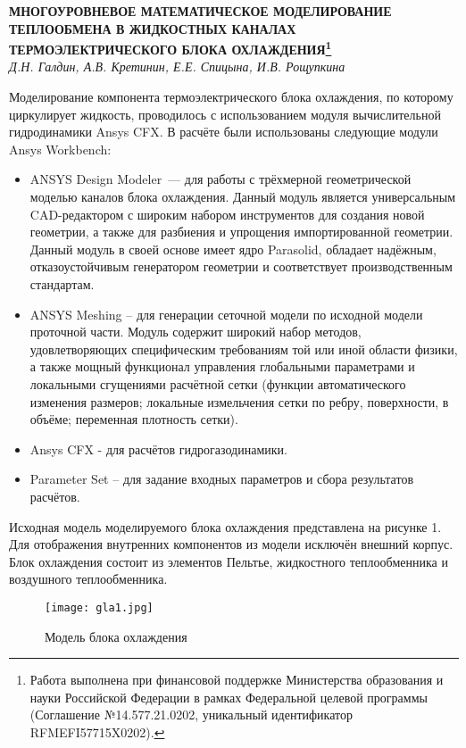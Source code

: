 \begin{center}{ \bf  МНОГОУРОВНЕВОЕ МАТЕМАТИЧЕСКОЕ МОДЕЛИРОВАНИЕ ТЕПЛООБМЕНА В ЖИДКОСТНЫХ КАНАЛАХ ТЕРМОЭЛЕКТРИЧЕСКОГО БЛОКА ОХЛАЖДЕНИЯ\footnote{Работа выполнена при финансовой поддержке Министерства образования и науки Российской Федерации в рамках Федеральной целевой программы (Соглашение №14.577.21.0202, уникальный идентификатор RFMEFI57715X0202).}}\\
{\it Д.Н. Галдин, А.В. Кретинин, Е.Е. Спицына, И.В. Рощупкина} \\
\end{center}

Моделирование компонента термоэлектрического блока охлаждения, по которому циркулирует жидкость, проводилось с использованием модуля вычислительной гидродинамики Ansys CFX.
В расчёте были использованы следующие модули Ansys Workbench:
\begin{itemize}
	\item
		ANSYS Design Modeler~--- для работы с трёхмерной геометрической моделью каналов блока охлаждения.
		Данный модуль является универсальным CAD-ре\-да\-к\-то\-ром с широким набором инструментов для создания новой геометрии, а также для разбиения и упрощения импортированной геометрии. Данный модуль в своей основе имеет ядро Parasolid, обладает надёжным, отказоустойчивым генератором геометрии и соответствует производственным стандартам.
	\item
		ANSYS Meshing – для генерации сеточной модели по исходной модели проточной части. Модуль содержит широкий набор методов, удовлетворяющих специфическим требованиям той или иной области физики, а также мощный функционал управления глобальными параметрами и локальными сгущениями расчётной сетки (функции автоматического изменения размеров; локальные измельчения сетки по ребру, поверхности, в объёме; переменная плотность сетки).
	\item
		Ansys CFX - для расчётов гидрогазодинамики.
	\item
		Parameter Set – для задание входных параметров и сбора результатов расчётов.
\end{itemize}
Исходная модель моделируемого блока охлаждения представлена на рисунке 1. Для отображения внутренних компонентов из модели исключён внешний корпус. Блок охлаждения состоит из элементов Пельтье, жидкостного теплообменника и воздушного теплообменника.

\begin{figure}[h!]
	\centering
	\texttt{[image: gla1.jpg]}
	\caption{Модель блока охлаждения}
\end{figure}

